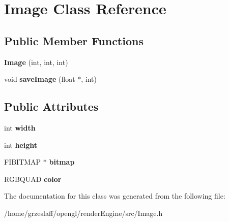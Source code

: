 \hypertarget{classImage}{\section{Image Class Reference}
\label{classImage}
}
\subsection*{Public Member Functions}
\begin{DoxyCompactItemize}
\item 
\hypertarget{classImage_a234708974835a929bbeaa6c21446b096}{{\bfseries Image} (int, int, int)}\label{classImage_a234708974835a929bbeaa6c21446b096}

\item 
\hypertarget{classImage_ad867a81db8b38af86db72fbeb0063904}{void {\bfseries save\-Image} (float $\ast$, int)}\label{classImage_ad867a81db8b38af86db72fbeb0063904}

\end{DoxyCompactItemize}
\subsection*{Public Attributes}
\begin{DoxyCompactItemize}
\item 
\hypertarget{classImage_ab8d12f635013c04159cd4d3d972bac88}{int {\bfseries width}}\label{classImage_ab8d12f635013c04159cd4d3d972bac88}

\item 
\hypertarget{classImage_a51df43db420c9c0b57536cb2dd36de5c}{int {\bfseries height}}\label{classImage_a51df43db420c9c0b57536cb2dd36de5c}

\item 
\hypertarget{classImage_ab515fa72f9361d28a32a8d5f3a382946}{F\-I\-B\-I\-T\-M\-A\-P $\ast$ {\bfseries bitmap}}\label{classImage_ab515fa72f9361d28a32a8d5f3a382946}

\item 
\hypertarget{classImage_a7c97cf757eba56a6fbf1afeea2103773}{R\-G\-B\-Q\-U\-A\-D {\bfseries color}}\label{classImage_a7c97cf757eba56a6fbf1afeea2103773}

\end{DoxyCompactItemize}


The documentation for this class was generated from the following file\-:\begin{DoxyCompactItemize}
\item 
/home/grzeslaff/opengl/render\-Engine/src/Image.\-h\end{DoxyCompactItemize}
